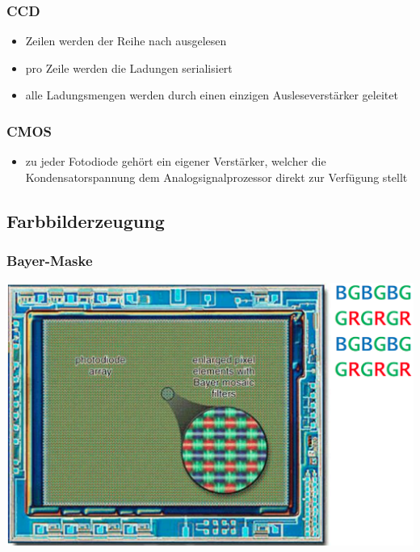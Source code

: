 \documentclass[10pt]{article}
\begin{document}
\subsubsection*{CCD}
\begin{itemize}
	\item Zeilen werden der Reihe nach ausgelesen
	\item pro Zeile werden die Ladungen serialisiert
	\item alle Ladungsmengen werden durch einen einzigen Ausleseverstärker geleitet
\end{itemize}
\subsubsection*{CMOS}
\begin{itemize}
	\item zu jeder Fotodiode gehört ein eigener Verstärker, welcher die Kondensatorspannung dem Analogsignalprozessor direkt zur Verfügung stellt
\end{itemize}

\subsection{Farbbilderzeugung}
\subsubsection*{Bayer-Maske}
\begin{center}
	\includegraphics[scale=0.15]{bayer-maske.png} 
\end{center}
\end{document}
